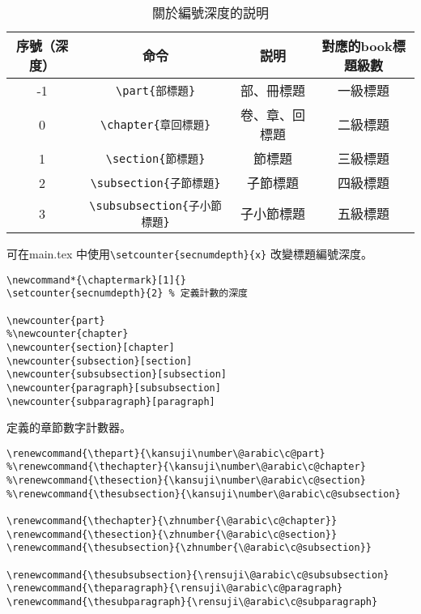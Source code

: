 \begin{table}[H]
\begin{center}
\caption{關於編號深度的説明}
\begin{tabular}{cccc}
\hline
序號（深度） & 命令& 説明 & 對應的book標題級數 \\ \hline
-1 & \verb+\part{部標題}+ & 部、冊標題 & 一級標題 \\
0 & \verb+\chapter{章回標題}+ & 卷、章、回標題 & 二級標題  \\
1 & \verb+\section{節標題}+ & 節標題 & 三級標題 \\
2 & \verb+\subsection{子節標題}+ & 子節標題 & 四級標題 \\
3 & \verb+\subsubsection{子小節標題}+ & 子小節標題 & 五級標題 \\ \hline
\end{tabular}
\end{center}
\end{table}

\par%
可在main.tex 中使用\verb+\setcounter{secnumdepth}{x}+
改變標題編號深度。
%
\begin{lstlisting}[firstnumber=930]
%文檔結構設定
\newcommand*{\chaptermark}[1]{}
\setcounter{secnumdepth}{2}	% 定義計數的深度

\newcounter{part}
%\newcounter{chapter}
\newcounter{section}[chapter]
\newcounter{subsection}[section]
\newcounter{subsubsection}[subsection]
\newcounter{paragraph}[subsubsection]
\newcounter{subparagraph}[paragraph]
\end{lstlisting}

\par%
定義的章節數字計數器。
\begin{lstlisting}[firstnumber=942]
\renewcommand{\thepart}{\kansuji\number\@arabic\c@part}
%\renewcommand{\thechapter}{\kansuji\number\@arabic\c@chapter}
%\renewcommand{\thesection}{\kansuji\number\@arabic\c@section}
%\renewcommand{\thesubsection}{\kansuji\number\@arabic\c@subsection}

\renewcommand{\thechapter}{\zhnumber{\@arabic\c@chapter}}
\renewcommand{\thesection}{\zhnumber{\@arabic\c@section}}
\renewcommand{\thesubsection}{\zhnumber{\@arabic\c@subsection}}

\renewcommand{\thesubsubsection}{\rensuji\@arabic\c@subsubsection}
\renewcommand{\theparagraph}{\rensuji\@arabic\c@paragraph}
\renewcommand{\thesubparagraph}{\rensuji\@arabic\c@subparagraph}
\end{lstlisting}

